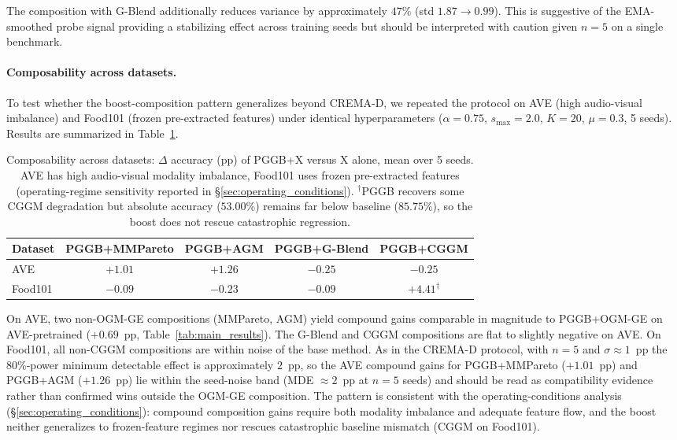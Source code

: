 \documentclass{article}
\begin{document}
The composition with G-Blend additionally reduces variance by approximately $47\%$ (std $1.87 \to 0.99$). This is suggestive of the EMA-smoothed probe signal providing a stabilizing effect across training seeds but should be interpreted with caution given $n{=}5$ on a single benchmark.

\paragraph{Composability across datasets.} To test whether the boost-composition pattern generalizes beyond CREMA-D, we repeated the protocol on AVE (high audio-visual imbalance) and Food101 (frozen pre-extracted features) under identical hyperparameters ($\alpha{=}0.75$, $s_{\max}{=}2.0$, $K{=}20$, $\mu{=}0.3$, 5 seeds). Results are summarized in Table~\ref{tab:composability_extended}.

\begin{table}[H]
\centering
\caption{Composability across datasets: $\Delta$ accuracy (pp) of PGGB+X versus X alone, mean over 5 seeds. AVE has high audio-visual modality imbalance, Food101 uses frozen pre-extracted features (operating-regime sensitivity reported in \S\ref{sec:operating_conditions}). $^\dagger$PGGB recovers some CGGM degradation but absolute accuracy ($53.00\%$) remains far below baseline ($85.75\%$), so the boost does not rescue catastrophic regression.}
\label{tab:composability_extended}
\begin{tabular}{lcccc}
\toprule
\textbf{Dataset} & \textbf{PGGB+MMPareto} & \textbf{PGGB+AGM} & \textbf{PGGB+G-Blend} & \textbf{PGGB+CGGM} \\
\midrule
AVE     & $+1.01$ & $+1.26$ & $-0.25$ & $-0.25$ \\
Food101 & $-0.09$ & $-0.23$ & $-0.09$ & $+4.41^\dagger$ \\
\bottomrule
\end{tabular}
\end{table}

On AVE, two non-OGM-GE compositions (MMPareto, AGM) yield compound gains comparable in magnitude to PGGB+OGM-GE on AVE-pretrained ($+0.69$~pp, Table~\ref{tab:main_results}). The G-Blend and CGGM compositions are flat to slightly negative on AVE. On Food101, all non-CGGM compositions are within noise of the base method. As in the CREMA-D protocol, with $n{=}5$ and $\sigma \approx 1$~pp the 80\%-power minimum detectable effect is approximately $2$~pp, so the AVE compound gains for PGGB+MMPareto ($+1.01$~pp) and PGGB+AGM ($+1.26$~pp) lie within the seed-noise band (MDE $\approx 2$~pp at $n{=}5$ seeds) and should be read as compatibility evidence rather than confirmed wins outside the OGM-GE composition. The pattern is consistent with the operating-conditions analysis (\S\ref{sec:operating_conditions}): compound composition gains require both modality imbalance and adequate feature flow, and the boost neither generalizes to frozen-feature regimes nor rescues catastrophic baseline mismatch (CGGM on Food101).
\end{document}
